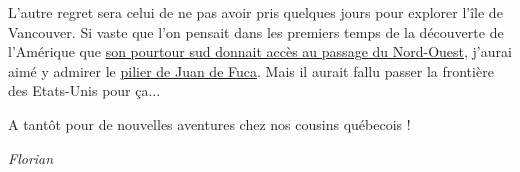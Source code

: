 L'autre regret sera celui de ne pas avoir pris quelques jours pour
explorer l'île de Vancouver. Si vaste que l'on pensait dans les premiers
temps de la découverte de l'Amérique que
\href{https://www.franceinter.fr/emissions/sur-les-epaules-de-darwin/sur-les-epaules-de-darwin-01-octobre-2016}{son
pourtour sud donnait accès au passage du Nord-Ouest}, j'aurai aimé y
admirer le
\href{https://fr.wikipedia.org/wiki/Cap_Flattery\#/media/File:CapeFlatteryWashington.jpg}{pilier
de Juan de Fuca}. Mais il aurait fallu passer la frontière des
Etats-Unis pour ça...

A tantôt pour de nouvelles aventures chez nos cousins québecois !

\emph{Florian}



